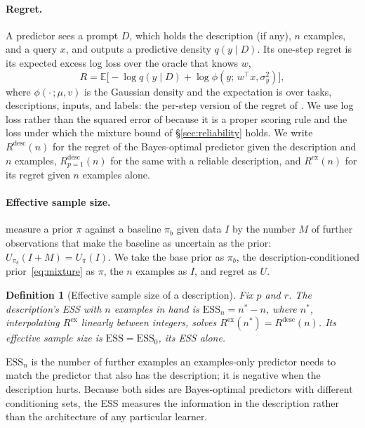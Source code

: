 \documentclass[10pt]{article}
\newtheorem{definition}{Definition}
\newcommand{\ess}{\mathrm{ESS}}
\newcommand{\E}{\mathbb{E}}
\begin{document}
\paragraph{Regret.}
A predictor sees a prompt $D$, which holds the description (if any), $n$ examples, and a query $x$, and outputs a predictive density $q(y \mid D)$. Its one-step regret is its expected excess log loss over the oracle that knows $w$,
\begin{equation}\label{eq:regret}
R = \E\big[-\log q(y \mid D) + \log \phi(y;\, w^\top x, \sigma_y^2)\big],
\end{equation}
where $\phi(\cdot\,; \mu, v)$ is the Gaussian density and the expectation is over tasks, descriptions, inputs, and labels: the per-step version of the regret of \citet{genewein2025}. We use log loss rather than the squared error of \citet{garg2022} because it is a proper scoring rule and the loss under which the mixture bound of \S\ref{sec:reliability} holds. We write $R^{\mathrm{desc}}(n)$ for the regret of the Bayes-optimal predictor given the description and $n$ examples, $R^{\mathrm{desc}}_{p=1}(n)$ for the same with a reliable description, and $R^{\mathrm{ex}}(n)$ for its regret given $n$ examples alone.

\paragraph{Effective sample size.}
\citet{reimherr2021} measure a prior $\pi$ against a baseline $\pi_b$ given data $I$ by the number $M$ of further observations that make the baseline as uncertain as the prior: $U_{\pi_b}(I + M) = U_\pi(I)$. We take the base prior as $\pi_b$, the description-conditioned prior~\eqref{eq:mixture} as $\pi$, the $n$ examples as $I$, and regret as $U$.

\begin{definition}[Effective sample size of a description]\label{def:ess}
Fix $p$ and $r$. The description's ESS with $n$ examples in hand is $\ess_n = n^* - n$, where $n^*$, interpolating $R^{\mathrm{ex}}$ linearly between integers, solves $R^{\mathrm{ex}}(n^*) = R^{\mathrm{desc}}(n)$. Its \emph{effective sample size} is $\ess = \ess_0$, its ESS alone.
\end{definition}

$\ess_n$ is the number of further examples an examples-only predictor needs to match the predictor that also has the description; it is negative when the description hurts. Because both sides are Bayes-optimal predictors with different conditioning sets, the ESS measures the information in the description rather than the architecture of any particular learner.
\end{document}
